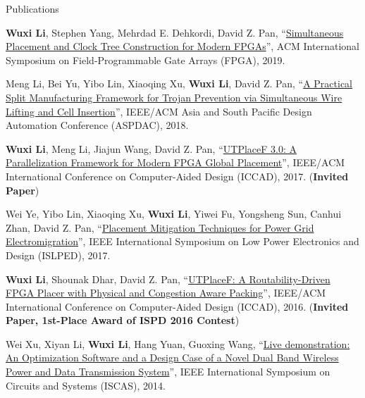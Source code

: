 \begin{rSection}{Publications}
\begin{description}[font=\normalfont]
\item[{[C6]}]{
    \textbf{Wuxi Li}, Stephen Yang, Mehrdad E. Dehkordi, David Z. Pan,
    ``\href{https://dl.acm.org/citation.cfm?id=3293897}{Simultaneous Placement and Clock Tree Construction for Modern FPGAs}'',
    ACM International Symposium on Field-Programmable Gate Arrays (FPGA), 2019.
}

\item[{[C5]}]{
    Meng Li, Bei Yu, Yibo Lin, Xiaoqing Xu, \textbf{Wuxi Li}, David Z. Pan,
    ``\href{https://ieeexplore.ieee.org/document/8297316}{A Practical Split Manufacturing Framework for Trojan Prevention via Simultaneous Wire Lifting and Cell Insertion}'',
    IEEE/ACM Asia and South Pacific Design Automation Conference (ASPDAC), 2018.
}

\item[{[C4]}]{
    \textbf{Wuxi Li}, Meng Li, Jiajun Wang, David Z. Pan,
    ``\href{https://ieeexplore.ieee.org/abstract/document/8203879/}{UTPlaceF 3.0: A Parallelization Framework for Modern FPGA Global Placement}'',
    IEEE/ACM International Conference on Computer-Aided Design (ICCAD), 2017.
    (\textbf{Invited Paper})
}

\item[{[C3]}]{
    Wei Ye, Yibo Lin, Xiaoqing Xu, \textbf{Wuxi Li}, Yiwei Fu, Yongsheng Sun, Canhui Zhan, David Z. Pan,
    ``\href{http://ieeexplore.ieee.org/document/8009178/}{Placement Mitigation Techniques for Power Grid Electromigration}'',
    IEEE International Symposium on Low Power Electronics and Design (ISLPED), 2017.
}

\item[{[C2]}]{
    \textbf{Wuxi Li}, Shounak Dhar, David Z. Pan,
    ``\href{http://ieeexplore.ieee.org/document/7827643/}{UTPlaceF: A Routability-Driven FPGA Placer with Physical and Congestion Aware Packing}'',
    IEEE/ACM International Conference on Computer-Aided Design (ICCAD), 2016.
    (\textbf{Invited Paper, 1st-Place Award of ISPD 2016 Contest})
}

\item[{[C1]}]{
    Wei Xu, Xiyan Li, \textbf{Wuxi Li}, Hang Yuan, Guoxing Wang,
    ``\href{http://ieeexplore.ieee.org/document/6865159/}{Live demonstration: An Optimization Software and a Design Case of a Novel Dual Band Wireless Power and Data Transmission System}'',
    IEEE International Symposium on Circuits and Systems (ISCAS), 2014.
}

\end{description}

\end{rSection}
